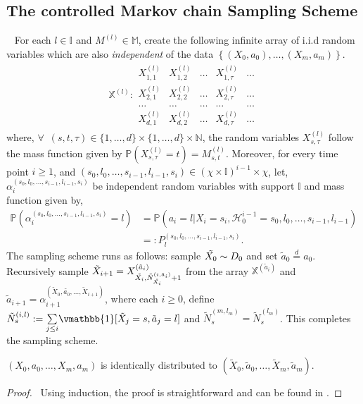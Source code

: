 \documentclass[opre,sglanonrev]{informs4}
\numberwithin{equation}{section}
\newcommand{\pow}[1]{^{(#1)}}
\newcommand{\lp}{\left(}
\newcommand{\rp}{\right)}
\newcommand{\History}{\mathcal{H}}
\newcommand{\Ibb}{\mathbb{I}}
\newcommand{\Mbb}{\mathbb{M}}
\newcommand{\Pbb}{\mathbb{P}}
\newcommand{\Xbb}{\mathbb{X}}
\newcommand{\statespace}{\{1,\dots, d\}}
\newcommand{\indexeddata}{\left\{(X_0,a_0),\dots,(X_m,a_m)\right\}}
\newcommand{\prob}{\Pbb}
\newcommand{\initialD}{D_0}
\newcommand{\indicator}{\vmathbb{1}}
\begin{document}
\begin{APPENDICES}
\section{The controlled Markov chain Sampling Scheme}~\label{Sec:mdp-sampling}
For each $l \in \Ibb$ and $M^{(l)}\in\Mbb$, create the following infinite array of i.i.d random variables which are also \emph{independent} of the data $\indexeddata$.
\begin{align}
    \Xbb^{(l)} : \begin{array}{ccccc}
        X_{1,1}^{(l)} & X_{1,2}^{(l)} & \dots & X_{1,\tau}^{(l)} & \dots \\
        X_{2,1}^{(l)} & X_{2,2}^{(l)} & \dots & X_{2,\tau}^{(l)} & \dots \\ 
        \dots &\dots &\dots &\dots & \dots \\
        X_{d,1}^{(l)} & X_{d,2}^{(l)} & \dots & X_{d,\tau}^{(l)} & \dots
    \end{array}
\end{align}
where, $\forall \enspace (s,t,\tau)\in \statespace \times \statespace \times \mathbb{N}$, the random variables $X_{s,\tau}^{(l)}$ follow the mass function given by $\prob (X_{s,\tau}^{(l)}=t)=M_{s,t}^{(l)}$.
Moreover, for every time point $i\geq 1$, and $(s_0,l_0,\dots,s_{i-1},l_{i-1},s_i)\in (\chi\times\Ibb)^{i-1}\times \chi$, let, $\alpha_i\pow{s_0,l_0,\dots,s_{i-1},l_{i-1},s_i}$ be independent random variables with support $\Ibb$ and mass function given by,
\begin{align*}
    \prob( \alpha_i\pow{s_0,l_0,\dots,s_{i-1},l_{i-1},s_i}=l)& = \prob(a_i=l|X_i=s_i,\History_0^{i-1}=s_0,l_0,\dots,s_{i-1},l_{i-1})\\
    & =: P_l\pow{s_0,l_0,\dots,s_{i-1},l_{i-1},s_i}.
\end{align*}
The sampling scheme runs as follows: sample $\Tilde{X_0}\sim \initialD$ and set $\tilde a_0\overset{d}{=} a_0$. 
Recursively sample $\Tilde{X}_{i+1}= X_{\Tilde{X_i},\Tilde{N}_{\Tilde{X_i}}^{(i,\tilde a_i)}+1}\pow{\tilde a_i}$ from the array $\Xbb^{(\tilde a_{i})}$ and $\tilde a_{i+1}{=}\alpha_{i+1}\pow{\tilde X_0,\tilde{a_0},\dots,\tilde X_{i+1}}$, where each $i\geq 0$, define $\tilde{N}_{s}\pow{i,l}:=\underset{j\leq i}{\sum}\indicator[\Tilde{X}_j=s,\tilde a_j=l]$ and $\tilde {N}_{s}\pow{m, l_m}=\tilde {N}_{s}\pow{l_m}$. 
This completes the sampling scheme.  
\begin{proposition}\label{prop:mod-sampling-scheme}
$\lp X_0,a_0,\dots,X_m,a_m\rp$ is identically distributed to $\lp \tilde X_0,\tilde a_0,\dots,\tilde X_m,\tilde a_m\rp$.
\end{proposition}
\begin{proof} \ 
Using induction, the proof is straightforward and can be found in .
\end{proof}



\end{APPENDICES}
\end{document}
